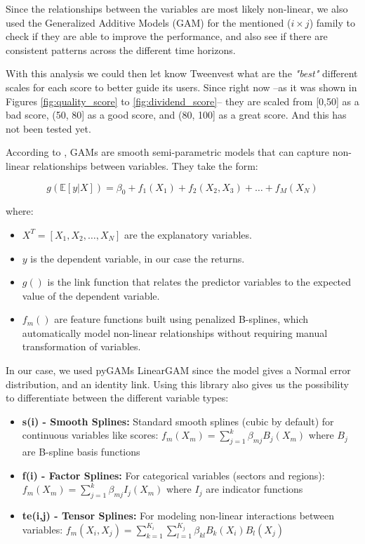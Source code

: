 \documentclass[11pt,english,a4paper,hidelinks]{book}
\begin{document}
Since the relationships between the variables are most likely non-linear, we also used the Generalized Additive Models (GAM) for the mentioned (\(i \times j\)) family to check if they are able to improve the performance, and also see if there are consistent patterns across the different time horizons.

\vspace{0.5cm}
\noindent With this analysis we could then let know Tweenvest what are the \textit{"best"} different scales for each score to better guide its users. Since right now --as it was shown in Figures \ref{fig:quality_score} to \ref{fig:dividend_score}-- they are scaled from [0,50] as a bad score, (50, 80] as a good score, and (80, 100] as a great score. And this has not been tested yet.

\vspace{0.5cm}
\noindent According to \textcite{pygam2018}, GAMs are smooth semi-parametric models that can capture non-linear relationships between variables. They take the form:

\begin{equation}
    g(\mathbb{E}[y|X]) = \beta_0 + f_1(X_1) + f_2(X_2,X_3) + \dots + f_M(X_N)
\end{equation}

\noindent where:
\begin{itemize}
    \item \(X^T = [X_1, X_2, \dots, X_N]\) are the explanatory variables.
    \item \(y\) is the dependent variable, in our case the returns.
    \item \(g()\) is the link function that relates the predictor variables to the expected value of the dependent variable.
    \item \(f_m()\) are feature functions built using penalized B-splines, which automatically model non-linear relationships without requiring manual transformation of variables.
\end{itemize}

\noindent In our case, we used pyGAMs LinearGAM since the model gives a Normal error distribution, and an identity link. Using this library also gives us the possibility to differentiate between the different variable types:

\begin{itemize}
    \item \textbf{s(i) - Smooth Splines:} Standard smooth splines (cubic by default) for continuous variables like scores: \(f_m(X_m) = \sum_{j=1}^{k} \beta_{mj} B_j(X_m)\) where \(B_j\) are B-spline basis functions
    \item \textbf{f(i) - Factor Splines:} For categorical variables (sectors and regions): \(f_m(X_m) = \sum_{j=1}^{k} \beta_{mj} I_j(X_m)\) where \(I_j\) are indicator functions
    \item \textbf{te(i,j) - Tensor Splines:} For modeling non-linear interactions between variables: \(f_m(X_i, X_j) = \sum_{k=1}^{K_i} \sum_{l=1}^{K_j} \beta_{kl} B_k(X_i) B_l(X_j)\)
\end{itemize}
\end{document}
